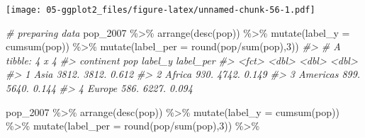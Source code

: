\documentclass[
]{book}
\newenvironment{Shaded}{\begin{snugshade}}{\end{snugshade}}
\newcommand{\AttributeTok}[1]{\textcolor[rgb]{0.77,0.63,0.00}{#1}}
\newcommand{\CommentTok}[1]{\textcolor[rgb]{0.56,0.35,0.01}{\textit{#1}}}
\newcommand{\DecValTok}[1]{\textcolor[rgb]{0.00,0.00,0.81}{#1}}
\newcommand{\FunctionTok}[1]{\textcolor[rgb]{0.00,0.00,0.00}{#1}}
\newcommand{\NormalTok}[1]{#1}
\newcommand{\SpecialCharTok}[1]{\textcolor[rgb]{0.00,0.00,0.00}{#1}}
\begin{document}
\texttt{[image: 05-ggplot2\_files/figure-latex/unnamed-chunk-56-1.pdf]}

\begin{Shaded}
\begin{Highlighting}[]

\CommentTok{\# preparing data}
\NormalTok{pop\_2007 }\SpecialCharTok{\%\textgreater{}\%}
\FunctionTok{arrange}\NormalTok{(}\FunctionTok{desc}\NormalTok{(pop)) }\SpecialCharTok{\%\textgreater{}\%}
\FunctionTok{mutate}\NormalTok{(}\AttributeTok{label\_y =} \FunctionTok{cumsum}\NormalTok{(pop)) }\SpecialCharTok{\%\textgreater{}\%}
\FunctionTok{mutate}\NormalTok{(}\AttributeTok{label\_per =} \FunctionTok{round}\NormalTok{(pop}\SpecialCharTok{/}\FunctionTok{sum}\NormalTok{(pop),}\DecValTok{3}\NormalTok{))}
\CommentTok{\#\textgreater{} \# A tibble: 4 x 4}
\CommentTok{\#\textgreater{}   continent   pop label\_y label\_per}
\CommentTok{\#\textgreater{}   \textless{}fct\textgreater{}     \textless{}dbl\textgreater{}   \textless{}dbl\textgreater{}     \textless{}dbl\textgreater{}}
\CommentTok{\#\textgreater{} 1 Asia      3812.   3812.     0.612}
\CommentTok{\#\textgreater{} 2 Africa     930.   4742.     0.149}
\CommentTok{\#\textgreater{} 3 Americas   899.   5640.     0.144}
\CommentTok{\#\textgreater{} 4 Europe     586.   6227.     0.094}

\NormalTok{pop\_2007 }\SpecialCharTok{\%\textgreater{}\%}
\FunctionTok{arrange}\NormalTok{(}\FunctionTok{desc}\NormalTok{(pop)) }\SpecialCharTok{\%\textgreater{}\%}
\FunctionTok{mutate}\NormalTok{(}\AttributeTok{label\_y =} \FunctionTok{cumsum}\NormalTok{(pop)) }\SpecialCharTok{\%\textgreater{}\%}
\FunctionTok{mutate}\NormalTok{(}\AttributeTok{label\_per =} \FunctionTok{round}\NormalTok{(pop}\SpecialCharTok{/}\FunctionTok{sum}\NormalTok{(pop),}\DecValTok{3}\NormalTok{)) }\SpecialCharTok{\%\textgreater{}\%}


\end{Highlighting}
\end{Shaded}
\end{document}
